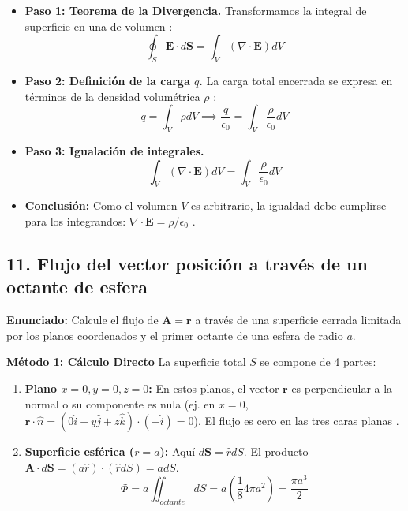 \documentclass[a4paper]{article}
\begin{document}
\begin{itemize}
    \item \textbf{Paso 1: Teorema de la Divergencia.} Transformamos la integral de superficie en una de volumen \cite{89, 92}:
    \begin{equation*}
        \oint_S \mathbf{E} \cdot d\mathbf{S} = \int_V (\nabla \cdot \mathbf{E}) dV
    \end{equation*}
    \item \textbf{Paso 2: Definición de la carga $q$.} La carga total encerrada se expresa en términos de la densidad volumétrica $\rho$ \cite{92}:
    \begin{equation*}
        q = \int_V \rho dV \implies \frac{q}{\epsilon_0} = \int_V \frac{\rho}{\epsilon_0} dV
    \end{equation*}
    \item \textbf{Paso 3: Igualación de integrales.}
    \begin{equation*}
        \int_V (\nabla \cdot \mathbf{E}) dV = \int_V \frac{\rho}{\epsilon_0} dV
    \end{equation*}
    \item \textbf{Conclusión:} Como el volumen $V$ es arbitrario, la igualdad debe cumplirse para los integrandos: $\nabla \cdot \mathbf{E} = \rho/\epsilon_0$ \cite{92}.
\end{itemize}

\subsection*{11. Flujo del vector posición a través de un octante de esfera}
\textbf{Enunciado:} Calcule el flujo de $\mathbf{A} = \mathbf{r}$ a través de una superficie cerrada limitada por los planos coordenados y el primer octante de una esfera de radio $a$.

\textbf{Método 1: Cálculo Directo}
La superficie total $S$ se compone de 4 partes:
\begin{enumerate}
    \item \textbf{Plano $x=0, y=0, z=0$:} En estos planos, el vector $\mathbf{r}$ es perpendicular a la normal o su componente es nula (ej. en $x=0$, $\mathbf{r} \cdot \hat{n} = (0\hat{i} + y\hat{j} + z\hat{k}) \cdot (-\hat{i}) = 0$). El flujo es cero en las tres caras planas \cite{92}.
    \item \textbf{Superficie esférica ($r=a$):} Aquí $d\mathbf{S} = \hat{r} dS$. El producto $\mathbf{A} \cdot d\mathbf{S} = (a\hat{r}) \cdot (\hat{r} dS) = a dS$.
    \begin{equation*}
        \Phi = a \iint_{octante} dS = a \left( \frac{1}{8} 4\pi a^2 \right) = \frac{\pi a^3}{2}
    \end{equation*}
\end{enumerate}
\end{document}
